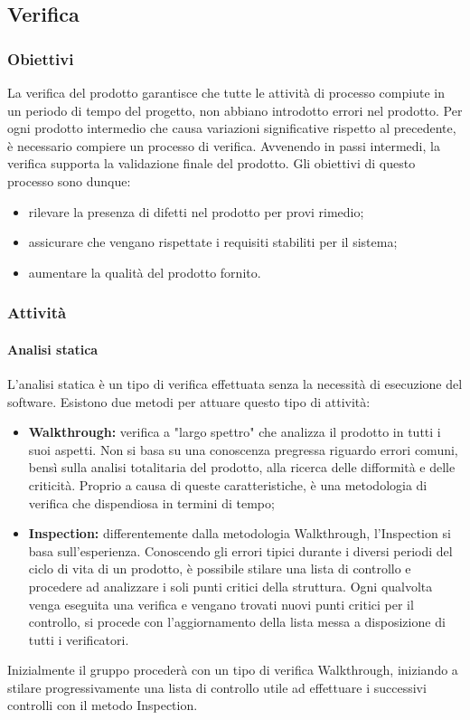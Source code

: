 \subsection{Verifica}
\subsubsection{Obiettivi}
La verifica del prodotto garantisce che tutte le attività di processo compiute in un periodo di tempo del progetto, non abbiano introdotto errori nel prodotto. Per ogni prodotto intermedio che causa variazioni significative rispetto al precedente, è necessario compiere un processo di verifica. Avvenendo in passi intermedi, la verifica supporta la validazione finale del prodotto. Gli obiettivi di questo processo sono dunque:
\begin{itemize}
	\item rilevare la presenza di difetti nel prodotto per provi rimedio;
	\item assicurare che vengano rispettate i requisiti stabiliti per il sistema;
	\item aumentare la qualità del prodotto fornito.
\end{itemize}

\subsubsection{Attività}
\paragraph{Analisi statica}
\noindent L'analisi statica è un tipo di verifica effettuata senza la necessità di esecuzione del software. Esistono due metodi per attuare questo tipo di attività:
\begin{itemize}
	\item \textbf{Walkthrough:} verifica a "largo spettro" che analizza il prodotto in tutti i suoi aspetti. Non si basa su una conoscenza pregressa riguardo errori comuni, bensì sulla analisi totalitaria del prodotto, alla ricerca delle difformità e delle criticità. Proprio a causa di queste caratteristiche, è una metodologia di verifica che dispendiosa in termini di tempo;
	\item \textbf{Inspection:} differentemente dalla metodologia Walkthrough, l'Inspection si basa sull'esperienza. Conoscendo gli errori tipici durante i diversi periodi del ciclo di vita di un prodotto, è possibile stilare una lista di controllo e procedere ad analizzare i soli punti critici della struttura. Ogni qualvolta venga eseguita una verifica e vengano trovati nuovi punti critici per il controllo, si procede con l'aggiornamento della lista messa a disposizione di tutti i verificatori.
\end{itemize}
Inizialmente il gruppo procederà con un tipo di verifica Walkthrough, iniziando a stilare progressivamente una lista di controllo utile ad effettuare i successivi controlli con il metodo Inspection.\\

